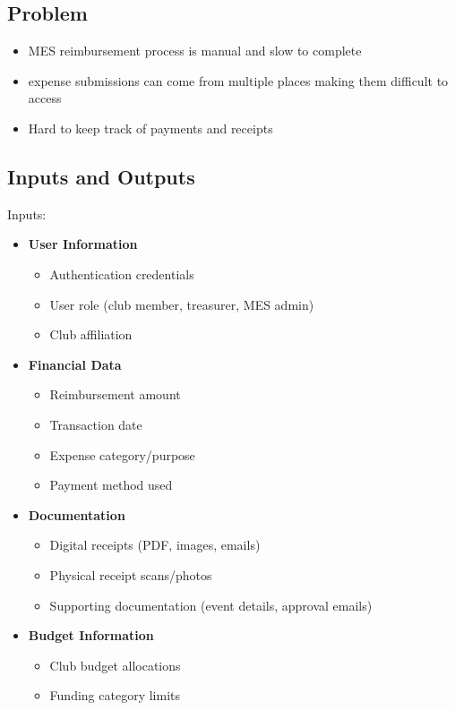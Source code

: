\documentclass{article}
\begin{document}
\subsection{Problem}
\begin{itemize}
    \item MES reimbursement process is manual and slow to complete
    \item expense submissions can come from multiple places making them difficult to access
    \item Hard to keep track of payments and receipts
  \end{itemize}

\subsection{Inputs and Outputs}
Inputs: 
\begin{itemize}
  \item \textbf{User Information}
    \begin{itemize}
      \item Authentication credentials
      \item User role (club member, treasurer, MES admin)
      \item Club affiliation
    \end{itemize}
  \item \textbf{Financial Data}
    \begin{itemize}
      \item Reimbursement amount
      \item Transaction date
      \item Expense category/purpose
      \item Payment method used
    \end{itemize}
  \item \textbf{Documentation}
    \begin{itemize}
      \item Digital receipts (PDF, images, emails)
      \item Physical receipt scans/photos
      \item Supporting documentation (event details, approval emails)
    \end{itemize}
  \item \textbf{Budget Information}
    \begin{itemize}
      \item Club budget allocations
      \item Funding category limits
    \end{itemize}
\end{itemize}
\end{document}

